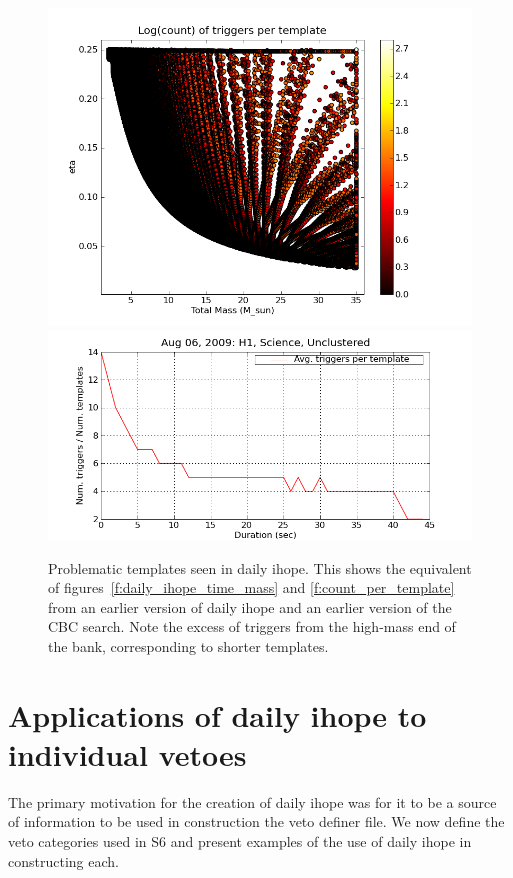 \begin{figure}
  \includegraphics[width=0.5\linewidth]{figures/detchar/20090806_H1_0_UNCLUSTERED_template_counts}
  \includegraphics[width=0.5\linewidth]{figures/detchar/20090806_H1_0_UNCLUSTERED_mass_hist_norm}
  \caption[Problematic templates seen in daily ihope]{
  \label{f:daily_ihope_el_glitcho}
Problematic templates seen in daily ihope.  This shows the equivalent
of figures~\ref{f:daily_ihope_time_mass} and
\ref{f:count_per_template} from an earlier version of daily ihope and
an earlier version of the CBC search.  Note the excess of triggers
from the high-mass end of the bank, corresponding to shorter
templates.
}
\end{figure}%



\section{Applications of daily ihope to individual vetoes}
\label{sec:applications_vetoes}

The primary motivation for the creation of daily ihope was 
for it to be a source of information to be used in construction the
veto definer file.  We now define the veto categories used in S6 and
present examples of the use of daily ihope in constructing each.

